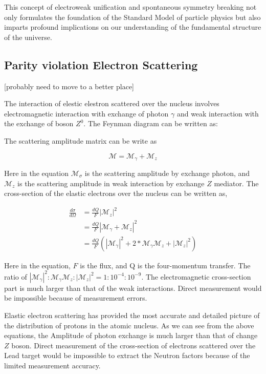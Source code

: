 This concept of electroweak unification and spontaneous symmetry breaking not only formulates the foundation of the Standard Model of particle physics but also imparts profound implications on our understanding of the fundamental structure of the universe. 


\subsection{Parity violation Electron Scattering}

[probably need to move to a better place]

The interaction of elestic elestron scattered over the nucleus involves electromagnetic interaction with exchange of photon $\gamma$ and weak interaction with the exchange of boson $Z^0$. The Feynman diagram can be written as:


The scattering amplitude matrix can be write as

\begin{equation}
    \mathcal{M} = \mathcal{M}_{\gamma} + \mathcal{M}_z
\end{equation}


Here in the equation $\mathcal{M}_{\sigma}$ is the scattering amplitude by exchange photon, and $\mathcal{M}_z$ is the scattering amplitude in weak interaction by exchange $Z$ mediator.  The cross-section of the elastic electrons over the nucleus can be written as, 

\begin{equation}
\begin{split}
        \frac{d\sigma}{d\Omega} &= \frac{dQ}{F} |  \mathcal{M}_z|^2 \\
        &= \frac{dQ}{F}|\mathcal{M}_{\gamma} + \mathcal{M}_z|^2 \\ 
        &= \frac{dQ}{F}(|\mathcal{M}_{\gamma}|^2 + 2*\mathcal{M}_{\gamma}\mathcal{M}_z + |\mathcal{M}_z|^2)
\end{split}
\end{equation}

Here in the equation, $F$ is the flux, and Q is the four-momentum transfer. The ratio of $|\mathcal{M}_{\gamma}|^2 : \mathcal{M}_{\gamma}\mathcal{M}_z : |\mathcal{M}_z|^2 = 1 : 10^{-4} : 10^{-9}$. The electromagnetic cross-section part is much larger than that of the weak interactions. Direct measurement would be impossible because of measurement errors. 


Elastic electron scattering has provided the most accurate and detailed picture of the distribution of protons in the atomic nucleus. As we can see from the above equations, the Amplitude of photon exchange is much larger than that of change $Z$ boson. Direct measurement of the cross-section of electrons scattered over the Lead target would be impossible to extract the Neutron factors because of the limited measurement accuracy.


